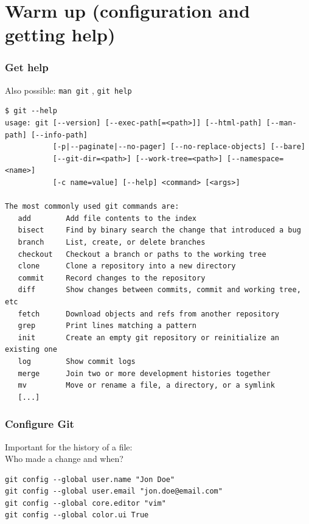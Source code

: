 \documentclass[handout,notes]{gittalk}
\newcommand{\hlcommand}[1]{ %
\colorbox{base3}{\small \texttt{#1}}
}
\begin{document}
\section{Warm up (configuration and getting help)}

\begin{frame}[fragile]
\frametitle{Get help}

\begin{tcolorbox}[title=git -{}-help]
Also possible: \hlcommand{man git}, \hlcommand{git help}
\end{tcolorbox}

\begin{lstlisting}[basicstyle=\tiny\ttfamily\color{black}]
$ git --help
usage: git [--version] [--exec-path[=<path>]] [--html-path] [--man-path] [--info-path]
           [-p|--paginate|--no-pager] [--no-replace-objects] [--bare]
           [--git-dir=<path>] [--work-tree=<path>] [--namespace=<name>]
           [-c name=value] [--help] <command> [<args>]

The most commonly used git commands are:
   add        Add file contents to the index
   bisect     Find by binary search the change that introduced a bug
   branch     List, create, or delete branches
   checkout   Checkout a branch or paths to the working tree
   clone      Clone a repository into a new directory
   commit     Record changes to the repository
   diff       Show changes between commits, commit and working tree, etc
   fetch      Download objects and refs from another repository
   grep       Print lines matching a pattern
   init       Create an empty git repository or reinitialize an existing one
   log        Show commit logs
   merge      Join two or more development histories together
   mv         Move or rename a file, a directory, or a symlink
   [...]

\end{lstlisting}
\end{frame}

\begin{frame}[fragile]
\frametitle{Configure Git}
\begin{tcolorbox}[title=git config]
Important for the history of a file:\\
Who made a change and when?
\end{tcolorbox}
\vspace*{2em}
\begin{lstlisting}
git config --global user.name "Jon Doe"
git config --global user.email "jon.doe@email.com"
git config --global core.editor "vim"
git config --global color.ui True
\end{lstlisting}
\end{frame}
\end{document}
